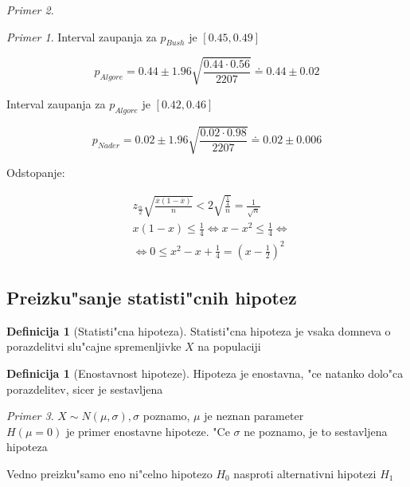 \documentclass[a4paper,12pt]{article}
\theoremstyle{definition}
\newtheorem{defn}[counter]{Definicija}
\theoremstyle{remark}
\newtheorem*{ex}{Primer}
\begin{document}
\begin{ex}
\begin{ex}
        Interval zaupanja za $p_{Bush}$ je $[0.45, 0.49]$

        \begin{equation*}
            p_{Algore} = 0.44 \pm 1.96 \sqrt{\frac{0.44 \cdot 0.56}{2207}} \doteq 0.44 \pm 0.02
        \end{equation*}

        Interval zaupanja za $p_{Algore}$ je $[0.42, 0.46]$

        \begin{equation*}
            p_{Nader} = 0.02 \pm 1.96 \sqrt{\frac{0.02 \cdot 0.98}{2207}} \doteq 0.02 \pm 0.006
        \end{equation*}

        Odstopanje:

        \begin{align*}
            &z_{\frac{\alpha}{2}} \sqrt{\frac{\overline{x} (1-\overline{x})}{n}} < 
                2 \sqrt{\frac{\frac{1}{4}}{n}} = \frac{1}{\sqrt{n}} \\
            &x(1-x) \leq \frac{1}{4} \iff x-x^2 \leq \frac{1}{4} \iff \\
            &\iff 0 \leq x^2 - x + \frac{1}{4} = (x-\frac{1}{2})^2
        \end{align*}
    \end{ex}
\end{ex}

\subsection{Preizku"sanje statisti"cnih hipotez}

\begin{defn}[Statisti"cna hipoteza]
    Statisti"cna hipoteza je vsaka domneva o porazdelitvi slu"cajne spremenljivke $X$ na populaciji
\end{defn}

\begin{defn}[Enostavnost hipoteze]
    Hipoteza je enostavna, "ce natanko dolo"ca porazdelitev, sicer je sestavljena
\end{defn}

\begin{ex}
    $X \sim N(\mu, \sigma), \sigma$ poznamo, $\mu$ je neznan parameter \\
    $H(\mu = 0)$ je primer enostavne hipoteze. "Ce $\sigma$ ne poznamo, je to sestavljena hipoteza
\end{ex}

Vedno preizku"samo eno ni"celno hipotezo $H_0$ nasproti alternativni hipotezi $H_1$
\end{document}
